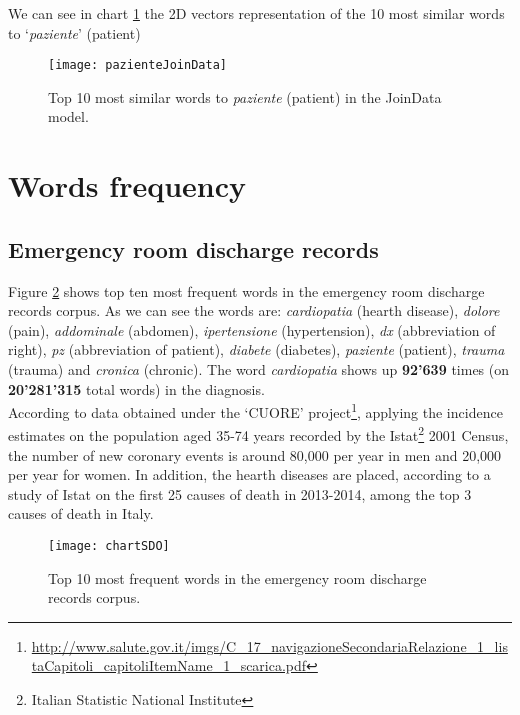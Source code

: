 We can see in chart \ref{fig:pazienteJoinData} the 2D vectors representation of the 10 most similar words to \enquote*{\textit{paziente}} (patient)
\begin{figure}[ht]
	\centering
	\texttt{[image: pazienteJoinData]}
	\caption[Patient - 10 most similar words plotted for JoinData model]{Top 10 most similar words to \textit{paziente} (patient) in the JoinData model.}
	\label{fig:pazienteJoinData}
\end{figure}

\section{Words frequency}

\subsection{Emergency room discharge records}
Figure \ref{fig:chartSDO} shows top ten most frequent words in the emergency room discharge records corpus. As we can see the words are: \textit{cardiopatia} (hearth disease), \textit{dolore} (pain), \textit{addominale} (abdomen), \textit{ipertensione} (hypertension), \textit{dx} (abbreviation of right), \textit{pz} (abbreviation of patient), \textit{diabete} (diabetes), \textit{paziente} (patient), \textit{trauma} (trauma) and \textit{cronica} (chronic).
The word \textit{cardiopatia} shows up \textbf{92'639} times (on \textbf{20'281'315} total words) in the diagnosis. \\
According to data obtained under the \enquote*{CUORE} project\footnote{\url{http://www.salute.gov.it/imgs/C_17_navigazioneSecondariaRelazione_1_listaCapitoli_capitoliItemName_1_scarica.pdf}}, applying the incidence estimates on the population aged 35-74 years recorded by the Istat\footnote{\label{istat}Italian Statistic National Institute} 2001 Census, the number of new coronary events is around 80,000 per year in men and 20,000 per year for women.
In addition, the hearth diseases are placed, according to a study of Istat on the first 25 causes of death in 2013-2014, among the top 3 causes of death in Italy.
\begin{figure}[ht]
	\centering
	\texttt{[image: chartSDO]}
	\caption[Top 10 most frequent words in emergency room discharge records]{Top 10 most frequent words in the emergency room discharge records corpus.}
	\label{fig:chartSDO}
\end{figure}

